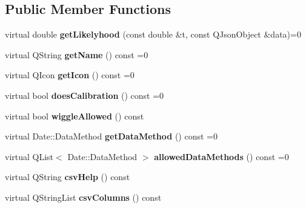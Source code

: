 \subsection*{Public Member Functions}
\begin{DoxyCompactItemize}
\item 
\hypertarget{class_plugin_abstract_aaf7c7d779779132d75ac27260ff3578c}{virtual double {\bfseries get\-Likelyhood} (const double \&t, const Q\-Json\-Object \&data)=0}\label{class_plugin_abstract_aaf7c7d779779132d75ac27260ff3578c}

\item 
\hypertarget{class_plugin_abstract_a26a0f82737fd42df258b1b7064942ab6}{virtual Q\-String {\bfseries get\-Name} () const =0}\label{class_plugin_abstract_a26a0f82737fd42df258b1b7064942ab6}

\item 
\hypertarget{class_plugin_abstract_aaca7ce417a3d8bda6bddcf1b9627479f}{virtual Q\-Icon {\bfseries get\-Icon} () const =0}\label{class_plugin_abstract_aaca7ce417a3d8bda6bddcf1b9627479f}

\item 
\hypertarget{class_plugin_abstract_a338b2d28ec8764af3006c3b5e1d8daed}{virtual bool {\bfseries does\-Calibration} () const =0}\label{class_plugin_abstract_a338b2d28ec8764af3006c3b5e1d8daed}

\item 
\hypertarget{class_plugin_abstract_a64d40af35d909c5047b7f40eb5fff66d}{virtual bool {\bfseries wiggle\-Allowed} () const }\label{class_plugin_abstract_a64d40af35d909c5047b7f40eb5fff66d}

\item 
\hypertarget{class_plugin_abstract_aaa6e9d2d358522e79baea266852607fc}{virtual Date\-::\-Data\-Method {\bfseries get\-Data\-Method} () const =0}\label{class_plugin_abstract_aaa6e9d2d358522e79baea266852607fc}

\item 
\hypertarget{class_plugin_abstract_a57fe74dd1ec1f481d661e171cd5e942f}{virtual Q\-List$<$ Date\-::\-Data\-Method $>$ {\bfseries allowed\-Data\-Methods} () const =0}\label{class_plugin_abstract_a57fe74dd1ec1f481d661e171cd5e942f}

\item 
\hypertarget{class_plugin_abstract_a7d8e6ac5a95eacd594f983ea9555f726}{virtual Q\-String {\bfseries csv\-Help} () const }\label{class_plugin_abstract_a7d8e6ac5a95eacd594f983ea9555f726}

\item 
\hypertarget{class_plugin_abstract_aa508aad8d92693c873f7b22cca6ef70b}{virtual Q\-String\-List {\bfseries csv\-Columns} () const }\label{class_plugin_abstract_aa508aad8d92693c873f7b22cca6ef70b}


\end{DoxyCompactItemize}
